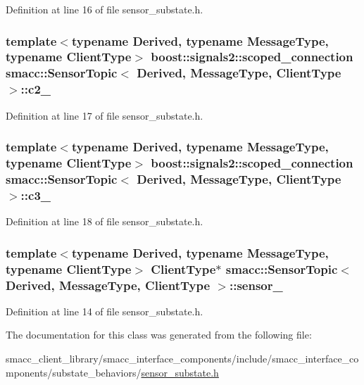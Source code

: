 Definition at line 16 of file sensor\+\_\+substate.\+h.

\subsubsection[{\texorpdfstring{c2\+\_\+}{c2_}}]{\setlength{\rightskip}{0pt plus 5cm}template$<$typename Derived, typename Message\+Type, typename Client\+Type$>$ boost\+::signals2\+::scoped\+\_\+connection {\bf smacc\+::\+Sensor\+Topic}$<$ Derived, Message\+Type, Client\+Type $>$\+::c2\+\_\+}\hypertarget{classsmacc_1_1SensorTopic_a1af6969425c827ae3e00121ba9da6a57}{}\label{classsmacc_1_1SensorTopic_a1af6969425c827ae3e00121ba9da6a57}


Definition at line 17 of file sensor\+\_\+substate.\+h.

\subsubsection[{\texorpdfstring{c3\+\_\+}{c3_}}]{\setlength{\rightskip}{0pt plus 5cm}template$<$typename Derived, typename Message\+Type, typename Client\+Type$>$ boost\+::signals2\+::scoped\+\_\+connection {\bf smacc\+::\+Sensor\+Topic}$<$ Derived, Message\+Type, Client\+Type $>$\+::c3\+\_\+}\hypertarget{classsmacc_1_1SensorTopic_ab204e71b44588ca208e2986e56dd3b87}{}\label{classsmacc_1_1SensorTopic_ab204e71b44588ca208e2986e56dd3b87}


Definition at line 18 of file sensor\+\_\+substate.\+h.

\subsubsection[{\texorpdfstring{sensor\+\_\+}{sensor_}}]{\setlength{\rightskip}{0pt plus 5cm}template$<$typename Derived, typename Message\+Type, typename Client\+Type$>$ Client\+Type$\ast$ {\bf smacc\+::\+Sensor\+Topic}$<$ Derived, Message\+Type, Client\+Type $>$\+::sensor\+\_\+}\hypertarget{classsmacc_1_1SensorTopic_a9a4d3eab86b06e9470f61e65c2e46321}{}\label{classsmacc_1_1SensorTopic_a9a4d3eab86b06e9470f61e65c2e46321}


Definition at line 14 of file sensor\+\_\+substate.\+h.



The documentation for this class was generated from the following file\+:\begin{DoxyCompactItemize}
\item 
smacc\+\_\+client\+\_\+library/smacc\+\_\+interface\+\_\+components/include/smacc\+\_\+interface\+\_\+components/substate\+\_\+behaviors/\hyperlink{sensor__substate_8h}{sensor\+\_\+substate.\+h}\end{DoxyCompactItemize}
